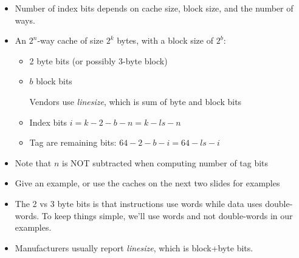 \begin{frame}[fragile]
	
\begin{itemize}
\item	Number of index bits depends on cache size, block size, and the
	number of ways.  
	
\item An $2^n$-way cache of size $2^k$ bytes, with a block size of $2^b$:
\begin{itemize}
\item 2 byte bits (or possibly 3-byte block)
\item $b$ block bits

	Vendors use {\em linesize}, which is sum of byte and block bits
\item Index bits $i=k-2-b-n=k-ls-n$ 
\item Tag are remaining bits: $64-2-b-i=64-ls-i$ 
\end{itemize}
\end{itemize}
\BNotes\ifnum{}
\begin{itemize}
\item Note that $n$ is NOT subtracted when computing number of tag bits
\item Give an example, or use the caches on the next two slides for examples
  
\item The 2 vs 3 byte bits is that instructions use words while data
  uses double-words.  To keep things simple, we'll use words and not
  double-words in our examples.
\item Manufacturers usually report {\em linesize}, which is block+byte bits.
\end{itemize}
\fi\ENotes
\end{frame}

